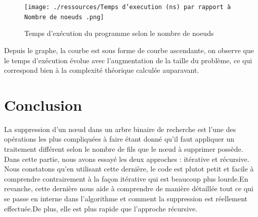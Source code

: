 \begin{figure}[H]
    \centering
        \texttt{[image: ./ressources/Temps d'execution (ns) par rapport à Nombre de noeuds .png]}
        \caption{Temps d'exécution du programme selon le nombre de noeuds}
    \label{fig:temps_exec_noeuds}
\end{figure}
\par
Depuis le graphe, la courbe est sous forme de courbe ascendante, on observe que le temps d'exécution évolue avec l'augmentation de la taille du problème, ce qui correspond bien à la complexité théorique calculée auparavant. 

\section{Conclusion}
La suppression d’un nœud dans un arbre binaire de recherche est l’une des opérations les plus compliquées à faire étant donné qu’il faut appliquer un traitement différent selon le nombre de fils que le nœud à supprimer possède.  Dans cette partie, nous avons essayé les deux approches : itérative et récursive. Nous constatons qu’en utilisant cette dernière, le code est plutot petit et facile à comprendre contrairement à la façon itérative qui est beaucoup plus lourde.En revanche, cette dernière nous aide à comprendre de manière détaillée tout ce qui se passe en interne dans l'algorithme et comment la suppression est réellement effectuée.De plus, elle est plus rapide que l'approche récursive.